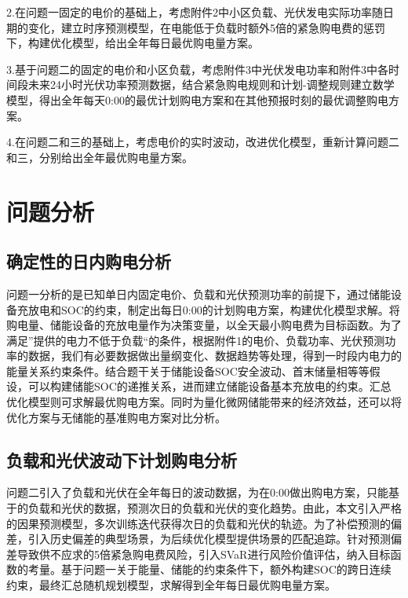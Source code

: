 \documentclass{cumcm2026}
\begin{document}
2.在问题一固定的电价的基础上，考虑附件2中小区负载、光伏发电实际功率随日期的变化，建立时序预测模型，在电能低于负载时额外5倍的紧急购电费的惩罚下，构建优化模型，给出全年每日最优购电量方案。

3.基于问题二的固定的电价和小区负载，考虑附件3中光伏发电功率和附件3中各时间段未来24小时光伏功率预测数据，结合紧急购电规则和计划-调整规则建立数学模型，得出全年每天0:00的最优计划购电方案和在其他预报时刻的最优调整购电方案。

4.在问题二和三的基础上，考虑电价的实时波动，改进优化模型，重新计算问题二和三，分别给出全年最优购电量方案。


\section{问题分析}

\subsection{确定性的日内购电分析}
问题一分析的是已知单日内固定电价、负载和光伏预测功率的前提下，通过储能设备充放电和SOC的约束，制定出每日0:00的计划购电方案，构建优化模型求解。将购电量、储能设备的充放电量作为决策变量，以全天最小购电费为目标函数。为了满足”提供的电力不低于负载“的条件，根据附件1的电价、负载功率、光伏预测功率的数据，我们有必要数据做出量纲变化、数据趋势等处理，得到一时段内电力的能量关系约束条件。结合题干关于储能设备SOC安全波动\cite{chen2009progress}、首末储量相等等假设，可以构建储能SOC的递推关系，进而建立储能设备基本充放电的约束。汇总优化模型则可求解最优购电方案。同时为量化微网储能带来的经济效益，还可以将优化方案与无储能的基准购电方案对比分析。

\subsection{负载和光伏波动下计划购电分析}
问题二引入了负载和光伏在全年每日的波动数据，为在0:00做出购电方案，只能基于的负载和光伏的数据，预测次日的负载和光伏的变化趋势。由此，本文引入严格的因果预测模型，多次训练迭代获得次日的负载和光伏的轨迹。为了补偿预测的偏差，引入历史偏差的典型场景，为后续优化模型提供场景的匹配追踪。针对预测偏差导致供不应求的5倍紧急购电费风险，引入SVaR进行风险价值评估，纳入目标函数的考量。基于问题一关于能量、储能的约束条件下，额外构建SOC的跨日连续约束，最终汇总随机规划模型，求解得到全年每日最优购电量方案。
\end{document}

